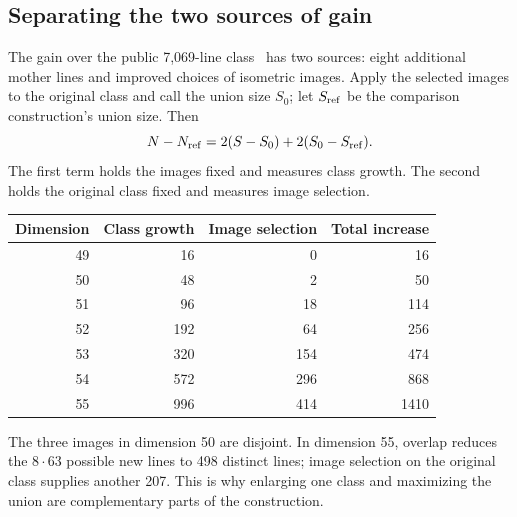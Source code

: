 \subsection{Separating the two sources of gain}

The gain over the public 7,069-line class~\cite{kissingnumbers} has two
sources: eight additional mother lines and improved choices of isometric
images. Apply the selected images to the original class and call the
union size $S_0$; let $S_{\rm ref}$ be the comparison construction's
union size. Then
\[
 N-N_{\rm ref}=2(S-S_0)+2(S_0-S_{\rm ref}).
\]
The first term holds the images fixed and measures class growth. The
second holds the original class fixed and measures image selection.

\begin{center}
\begin{tabular}{rrrr}
\toprule
Dimension&Class growth&Image selection&Total increase\\\midrule
49&16&0&16\\
50&48&2&50\\
51&96&18&114\\
52&192&64&256\\
53&320&154&474\\
54&572&296&868\\
55&996&414&1410\\\bottomrule
\end{tabular}
\end{center}

The three images in dimension 50 are disjoint. In dimension 55,
overlap reduces the $8\cdot63$ possible new lines to 498 distinct
lines; image selection on the original class supplies another 207.
This is why enlarging one class and maximizing the union are
complementary parts of the construction.
